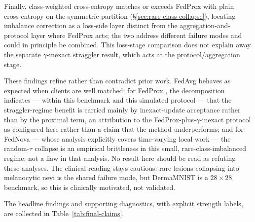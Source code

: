 \documentclass[11pt,a4paper]{report}
\begin{document}
Finally, class-weighted cross-entropy matches or exceeds FedProx with plain cross-entropy on the symmetric
partition (\S\ref{sec:rare-class-collapse}), locating imbalance correction as a
loss-side layer distinct from the aggregation-and-protocol layer where FedProx
acts; the two address different failure modes and could in principle be combined.
This loss-stage comparison does not explain away the separate $\gamma$-inexact
straggler result, which acts at the protocol/aggregation stage.

These findings refine rather than contradict prior work. FedAvg
\citep{mcmahan2017fedavg} behaves as expected when clients are well matched; for
FedProx \citep{li2020fedprox}, the decomposition indicates --- within this
benchmark and this simulated protocol --- that the straggler-regime benefit is
carried mainly by inexact-update acceptance rather than by the proximal term, an
attribution to the FedProx-plus-$\gamma$-inexact protocol as configured here
rather than a claim that the method underperforms; and for FedNova
\citep{wang2020fednova} --- whose analysis explicitly covers time-varying
local work --- the random-$\tau$ collapse is an empirical brittleness in this
small, rare-class-imbalanced regime, not a flaw in that analysis. No result
here should be read as refuting these analyses. The clinical reading stays
cautious: rare lesions collapsing into melanocytic nevi is the shared failure
mode, but DermaMNIST is a $28 \times 28$ benchmark, so this is clinically
motivated, not validated.

The headline findings and supporting diagnostics, with explicit strength labels,
are collected in Table~\ref{tab:final-claims}.
\end{document}
